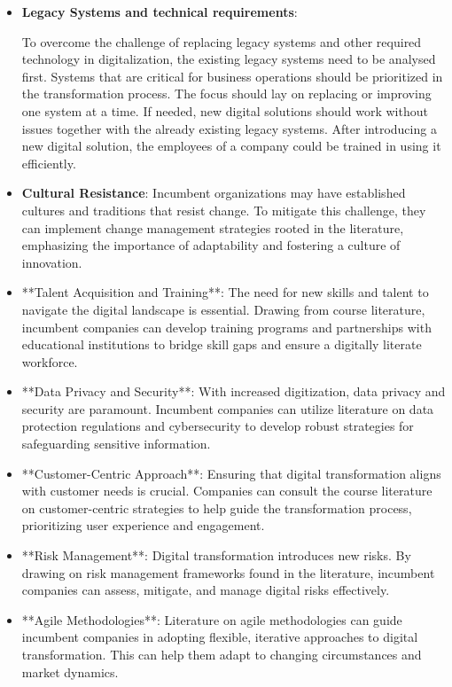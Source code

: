 \documentclass[a4]{scrartcl}
\begin{document}
\begin{itemize}
	
	\item \textbf{Legacy Systems and technical requirements}: 
	
	To overcome the challenge of replacing legacy systems and other required technology in digitalization, the existing legacy systems need to be analysed first. Systems that are critical for business operations should be prioritized in the transformation process. The focus should lay on replacing or improving one system at a time. 	
	If needed, new digital solutions should work without issues together with the already existing legacy systems. After introducing a new digital solution, the employees of a company could be trained in using it efficiently.~\cite{legacy, wiwi}
	
	
	
	
	\item \textbf{Cultural Resistance}: Incumbent organizations may have established cultures and traditions that resist change. To mitigate this challenge, they can implement change management strategies rooted in the literature, emphasizing the importance of adaptability and fostering a culture of innovation.~\cite{wiwi}
	
	
	\item **Talent Acquisition and Training**: The need for new skills and talent to navigate the digital landscape is essential. Drawing from course literature, incumbent companies can develop training programs and partnerships with educational institutions to bridge skill gaps and ensure a digitally literate workforce.
	
	\item **Data Privacy and Security**: With increased digitization, data privacy and security are paramount. Incumbent companies can utilize literature on data protection regulations and cybersecurity to develop robust strategies for safeguarding sensitive information.
	
	\item **Customer-Centric Approach**: Ensuring that digital transformation aligns with customer needs is crucial. Companies can consult the course literature on customer-centric strategies to help guide the transformation process, prioritizing user experience and engagement.
	
	
	\item **Risk Management**: Digital transformation introduces new risks. By drawing on risk management frameworks found in the literature, incumbent companies can assess, mitigate, and manage digital risks effectively.
	
	\item **Agile Methodologies**: Literature on agile methodologies can guide incumbent companies in adopting flexible, iterative approaches to digital transformation. This can help them adapt to changing circumstances and market dynamics.
	

	
\end{itemize}
\end{document}
